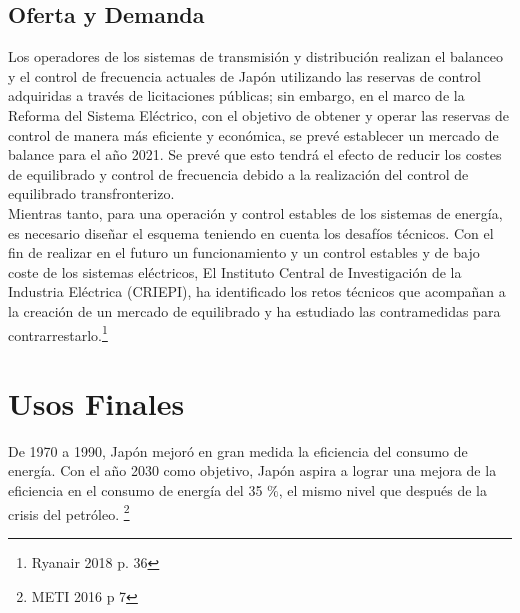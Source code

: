 \documentclass[]{article}
\begin{document}
\subsection{Oferta y Demanda}

Los operadores de los sistemas de transmisión y distribución realizan el balanceo y el control de frecuencia actuales de Japón utilizando las reservas de control adquiridas a través de licitaciones públicas; sin embargo, en el marco de la Reforma del Sistema Eléctrico, con el objetivo de obtener y operar las reservas de control de manera más eficiente y económica, se prevé establecer un mercado de balance para el año 2021. Se prevé que esto tendrá el efecto de reducir los costes de equilibrado y control de frecuencia debido a la realización del control de equilibrado transfronterizo.\\

Mientras tanto, para una operación y control estables de los sistemas de energía, es necesario diseñar el esquema teniendo en cuenta los desafíos técnicos. Con el fin de realizar en el futuro un funcionamiento y un control estables y de bajo coste de los sistemas eléctricos, El Instituto Central de Investigación de la Industria Eléctrica (CRIEPI), ha identificado los retos técnicos que acompañan a la creación de un mercado de equilibrado y ha estudiado las contramedidas para contrarrestarlo.\citep{Ryanair2018}\footnote{Ryanair 2018 p. 36}\\

\section{Usos Finales}

De 1970 a 1990, Japón mejoró en gran medida la eficiencia del consumo de energía. Con el año 2030 como objetivo, Japón aspira a lograr una mejora de la eficiencia en el consumo de energía del 35 $\%$, el mismo nivel que después de la crisis del petróleo. \citep{METI2016}\footnote{METI 2016 p 7}\\
\end{document}
